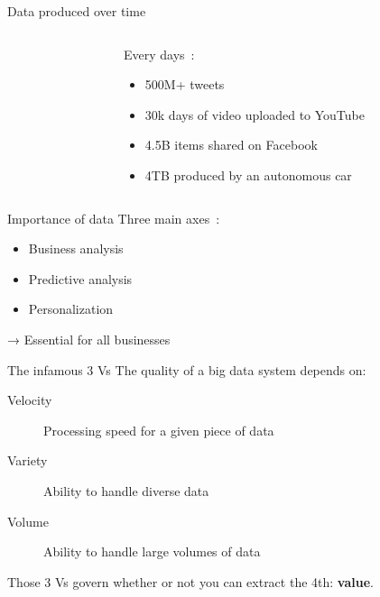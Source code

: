 \begin{frame}{Data produced over time}
  \begin{columns}
    \begin{column}{.65\textwidth}
    \end{column}
    \begin{column}{.50\textwidth}
      Every days~:
      \begin{itemize}
        \item 500M+ tweets
        \item 30k days of video uploaded to YouTube
        \item 4.5B items shared on Facebook
        \item 4TB produced by an autonomous car
      \end{itemize}
    \end{column}
  \end{columns}

\end{frame}


\begin{frame}{Importance of data}
  Three main axes~:
  \begin{itemize}
    \item Business analysis
    \item Predictive analysis
    \item Personalization
  \end{itemize}

  → Essential for all businesses
\end{frame}

\begin{frame}{The infamous 3 Vs}
  The quality of a big data system depends on:

  \begin{description}
    \item[Velocity] Processing speed for a given piece of data
    \item[Variety] Ability to handle diverse data
    \item[Volume] Ability to handle large volumes of data
  \end{description}

  Those 3 Vs govern whether or not you can extract the 4th: \textbf{value}.
\end{frame}
